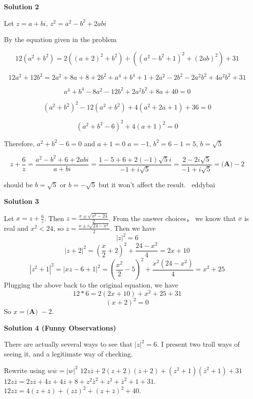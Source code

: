 \begin{enumerate}
\textbf{Solution 2}

Let $z = a + bi$, $z^2 = a^2-b^2+2abi$

 By the equation given in the problem

 
 \[12(a^2+b^2) = 2((a+2)^2 + b^2) + ((a^2-b^2+1)^2 + (2ab)^2) + 31\]

 \[12a^2 + 12b^2 = 2a^2 + 8a + 8 + 2b^2 + a^4 + b^4 + 1 + 2a^2 - 2b^2 - 2a^2b^2 + 4a^2b^2 + 31\]

 \[a^4 + b^4 - 8a^2 - 12b^2 + 2a^2b^2 + 8a + 40 = 0\]

 \[(a^2+b^2)^2 - 12(a^2+b^2) + 4(a^2 + 2a + 1) + 36=0\]

 \[(a^2 + b^2 - 6)^2 + 4(a+1)^2 = 0\]

 Therefore, $a^2 + b^2 - 6 = 0$ and $a+1 = 0$
$a = -1$, $b^2 = 6-1 = 5$, $b = \sqrt{5}$

 \[z + \frac{6}{z} = \frac{ a^2 - b^2 + 6 + 2abi }{ a+bi } = \frac{ 1 - 5 + 6 + 2(-1)\sqrt{5} i }{ -1 + i \sqrt{5} } = \frac{ 2 - 2i \sqrt{5} }{-1 + i \sqrt{5}} = \boxed{\textbf{(A)} -2}\]

 should be $b =  \sqrt{5}$ or $b =  -\sqrt{5}$ but it won't affect the result. ~eddybai

 



\textbf{Solution 3}

Let $x = z + \frac{6}{z}$. Then $z = \frac{x \pm \sqrt{x^2-24}}{2}$. From the answer choices， we know that $x$ is real and $x^2<24$, so $z = \frac{x \pm i\sqrt{24-x^2}}{2}$. Then we have
 \[|z|^2 = 6\]
 \[|z+2|^2 = (\frac{x}{2} + 2)^2 + \frac{24-x^2}{4} = 2x+10\]
 \[|z^2+1|^2 = |xz -6 +1|^2 = \left(\frac{x^2}{2}-5\right)^2 + \frac{x^2(24-x^2)}{4} = x^2 +25\]Plugging the above back to the original equation, we have
 \[12*6 = 2(2x+10) + x^2 + 25 + 31\]
 \[(x+2)^2 = 0\]So $x = \boxed{\textbf{(A) }-2}$. 

 



\textbf{Solution 4 (Funny Observations)}

There are actually several ways to see that $|z|^2 = 6.$ I present two troll ways of seeing it, and a legitimate way of checking.

 Rewrite using $w \overline{w} = |w|^2$
$12z \overline{z} + 2(z+2)(\overline{z} + 2) + (z^2+1)(\overline{z}^2+1)+31$$12 z \overline{z} = 2z \overline{z} + 4z + 4 \overline{z} + 8 + z^2 \overline{z}^2+z^2+\overline{z}^2 + 1 + 31.$$12 z \overline{z} = 4(z + \overline{z}) + (z \overline{z})^2 + (z + \overline{z})^2 + 40.$


\end{enumerate}
